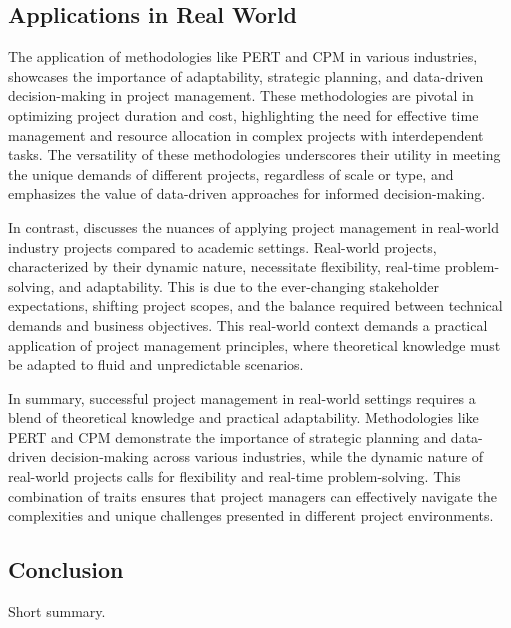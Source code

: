\documentclass{article}
\begin{document}
\subsection{Applications in Real World}
The application of methodologies like PERT and CPM in various industries\cite{cicmil2006rethinking}, showcases the importance of adaptability, strategic planning, and data-driven decision-making in project management. These methodologies are pivotal in optimizing project duration and cost, highlighting the need for effective time management and resource allocation in complex projects with interdependent tasks. The versatility of these methodologies underscores their utility in meeting the unique demands of different projects, regardless of scale or type, and emphasizes the value of data-driven approaches for informed decision-making.

In contrast\cite{knudson2009software}, discusses the nuances of applying project management in real-world industry projects compared to academic settings. Real-world projects, characterized by their dynamic nature, necessitate flexibility, real-time problem-solving, and adaptability. This is due to the ever-changing stakeholder expectations, shifting project scopes, and the balance required between technical demands and business objectives. This real-world context demands a practical application of project management principles, where theoretical knowledge must be adapted to fluid and unpredictable scenarios.

In summary, successful project management in real-world settings requires a blend of theoretical knowledge and practical adaptability. Methodologies like PERT and CPM demonstrate the importance of strategic planning and data-driven decision-making across various industries, while the dynamic nature of real-world projects calls for flexibility and real-time problem-solving. This combination of traits ensures that project managers can effectively navigate the complexities and unique challenges presented in different project environments.

\subsection{Conclusion}
Short summary.

\end{document}

